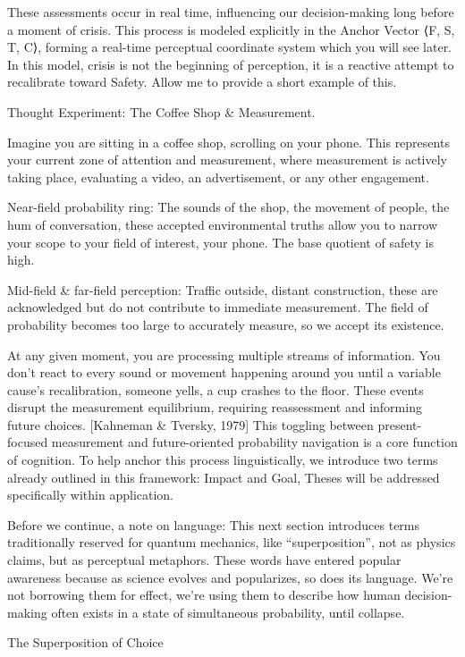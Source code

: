 \documentclass[11pt]{article}
\begin{document}
These assessments occur in real time, influencing our decision-making long before a moment of crisis. This process is modeled explicitly in the Anchor Vector ⟨F, S, T, C⟩, forming a real-time perceptual coordinate system which you will see later. In this model, crisis is not the beginning of perception, it is a reactive attempt to recalibrate toward Safety. Allow me to provide a short example of this. 

Thought Experiment: The Coffee Shop & Measurement.

Imagine you are sitting in a coffee shop, scrolling on your phone. This represents your current zone of attention and measurement, where measurement is actively taking place, evaluating a video, an advertisement, or any other engagement.

Near-field probability ring: The sounds of the shop, the movement of people, the hum of conversation, these accepted environmental truths allow you to narrow your scope to your field of interest, your phone. The base quotient of safety is high. 

Mid-field & far-field perception: Traffic outside, distant construction, these are acknowledged but do not contribute to immediate measurement. The field of probability becomes too large to accurately measure, so we accept its existence. 

At any given moment, you are processing multiple streams of information. You don’t react to every sound or movement happening around you until a variable cause’s recalibration, someone yells, a cup crashes to the floor. These events disrupt the measurement equilibrium, requiring reassessment and informing future choices. [Kahneman & Tversky, 1979] This toggling between present-focused measurement and future-oriented probability navigation is a core function of cognition. To help anchor this process linguistically, we introduce two terms already outlined in this framework: Impact and Goal, Theses will be addressed specifically within application. 

Before we continue, a note on language:
This next section introduces terms traditionally reserved for quantum mechanics, like “superposition”, not as physics claims, but as perceptual metaphors. These words have entered popular awareness because as science evolves and popularizes, so does its language.
We’re not borrowing them for effect, we’re using them to describe how human decision-making often exists in a state of simultaneous probability, until collapse.

The Superposition of Choice
\end{document}
